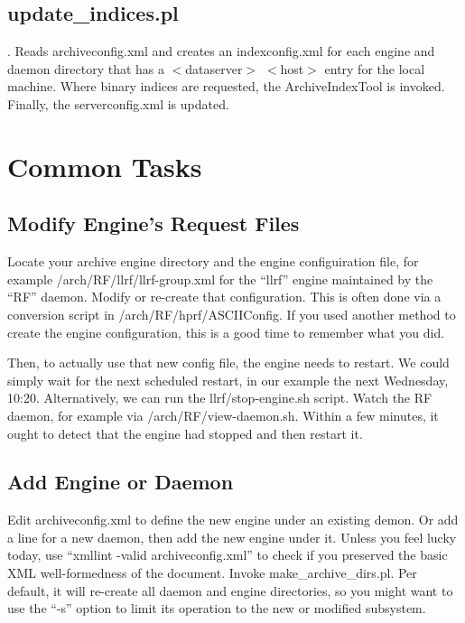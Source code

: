 \subsection{update\_indices.pl} \label{sec:updateIndices}.
Reads archiveconfig.xml and creates an indexconfig.xml for each
engine and daemon directory that has a $<$dataserver$>$ $<$host$>$
entry for the local machine.
Where binary indices are requested, the ArchiveIndexTool is invoked.
Finally, the serverconfig.xml is updated.

\section{Common Tasks}
\subsection{Modify Engine's Request Files}
Locate your archive engine directory and the engine configuiration
file, for example /arch/RF/llrf/llrf-group.xml for the ``llrf'' engine
maintained by the ``RF'' daemon.
Modify or re-create that configuration. This is often done via a conversion script in
/arch/RF/hprf/ASCIIConfig. If you used another method to create the
engine configuration, this is a good time to remember what you did.

Then, to actually use that new config file, the engine needs to
restart. We could simply wait for the next scheduled restart, in our
example the next Wednesday, 10:20. Alternatively, we can run the
llrf/stop-engine.sh script.
Watch the RF daemon, for example via /arch/RF/view-daemon.sh.
Within a few minutes, it ought to detect that the engine had stopped
and then restart it.

\subsection{Add Engine or Daemon}
Edit archiveconfig.xml to define the new engine under an existing
demon. Or add a line for a new daemon, then add the new engine under
it.  Unless you feel lucky today, use ``xmllint -valid
archiveconfig.xml'' to check if you preserved the basic XML
well-formedness of the document. Invoke make\_archive\_dirs.pl. Per
default, it will re-create all daemon and engine directories, so you
might want to use the ``-s'' option to limit its operation to the new
or modified subsystem.

